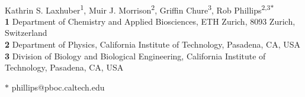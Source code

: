 \documentclass[10pt,letterpaper]{article}
\begin{document}
	\vspace*{0.2in}
	
	\begin{flushleft}
		{\Large
			\textbf{} %
		}
		\newline
		\\
		Kathrin S. Laxhuber\textsuperscript{1},
		Muir J. Morrison\textsuperscript{2},
		Griffin Chure\textsuperscript{3},
		Rob Phillips\textsuperscript{2,3$\ast$}
		\\
		\bigskip
		\textbf{1} Department of Chemistry and Applied Biosciences, ETH Zurich, 8093 Zurich, Switzerland
		\\
		\textbf{2} Department of Physics, California Institute of Technology, Pasadena, CA, USA
		\\
		\textbf{3} Division of Biology and Biological Engineering, California Institute of Technology, Pasadena, CA, USA
		\\
		\bigskip
		
		
		
		
		$\ast$ phillips@pboc.caltech.edu
		
	\end{flushleft}
\end{document}
